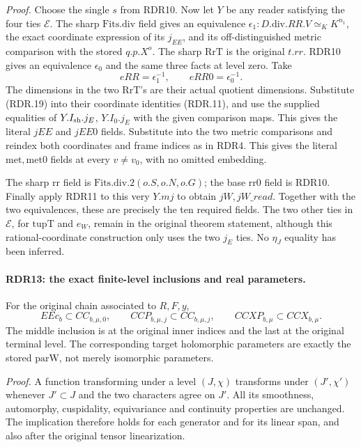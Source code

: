 \emph{Proof.}
Choose the single \(s\) from RDR10.  Now let \(Y\) be any
reader satisfying the four ties \(\mathcal E\).  The sharp
\(\mathrm{Fits.div}\) field gives an equivalence
\(\epsilon_1:D.\mathrm{div}.RR.V\simeq_KK^{n_1}\),
the exact coordinate expression of its \(j_{EE}\), and
its off-distinguished metric comparison with the stored
\(q.p.X^o\).  The sharp \(\mathrm{RrT}\) is the original
\(t.rr\).  RDR10 gives an equivalence \(\epsilon_0\) and
the same three facts at level zero.  Take
\[
                   eRR=\epsilon_1^{-1},\qquad
                   eRR0=\epsilon_0^{-1}.                   \tag{RDR.19}
\]
The dimensions in the two \(\mathrm{RrT}\)'s are their
actual quotient dimensions.  Substitute (RDR.19) into
their coordinate identities (RDR.11), and use the supplied
equalities of \(Y.I_{\rm sh}.j_E\), \(Y.I_0.j_E\) with
the given comparison maps.  This gives the literal \(jEE\)
and \(jEE0\) fields.  Substitute into the two metric
comparisons and reindex both coordinates and frame indices
as in RDR4.  This gives the literal \(\mathrm{met,met0}\)
fields at every \(v\ne v_0\), with no omitted embedding.

The sharp \(\mathrm{rr}\) field is
\(\mathrm{Fits.div}.2(o.S,o.N,o.G)\); the base \(\mathrm{rr0}\)
field is RDR10.  Finally apply RDR11 to this very \(Y.mj\)
to obtain \(jW,jW\_read\).  Together with the two equivalences,
these are precisely the ten required fields.  The two other
ties in \(\mathcal E\), for \(\mathrm{tupT}\) and \(e_W\),
remain in the original theorem statement, although this
rational-coordinate construction only uses the two \(j_E\)
ties.  No \(\eta_J\) equality has been inferred.

\paragraph{RDR13: the exact finite-level inclusions and real parameters.}
\label{claim:RDR13}
For the original chain associated to \(R,F,y\),
\[
 EEc_b\subset CC_{b,\mu,0},\qquad
 CCP_{b,\mu,j}\subset CC_{b,\mu,j},\qquad
 CCXP_{b,\mu}\subset CCX_{b,\mu}.                           \tag{RDR.20}
\]
The middle inclusion is at the original inner indices and the
last at the original terminal level.  The corresponding
target holomorphic parameters are exactly the stored
\(\mathrm{parW}\), not merely isomorphic parameters.

\emph{Proof.}
A function transforming under a level \((J,\chi)\) transforms
under \((J',\chi')\) whenever \(J'\subset J\) and the two
characters agree on \(J'\).  All its smoothness, automorphy,
cuspidality, equivariance and continuity properties are
unchanged.  The implication therefore holds for each generator
and for its linear span, and also after the original tensor
linearization.

